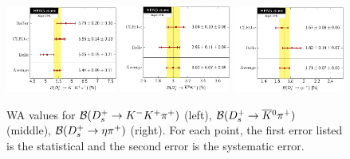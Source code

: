 \begin{figure}[hbt!]
\centering
\includegraphics[width=0.325\textwidth]{figures/charm/KKpi.pdf}
\includegraphics[width=0.325\textwidth]{figures/charm/K0K.pdf}
\includegraphics[width=0.325\textwidth]{figures/charm/etapi.pdf}
\caption{
WA values for ${\cal B}(D_{s}^+\to K^-K^+\pi^+)$ (left),
${\cal B}(D_{s}^+\to \overline{K}{}^0\pi^+)$ (middle), ${\cal B}(D_{s}^+\to \eta\pi^+)$ (right). For each point, the first error listed is the statistical and the second error is the systematic error.
\label{fig:DSExpHadronic}
}
\end{figure}
